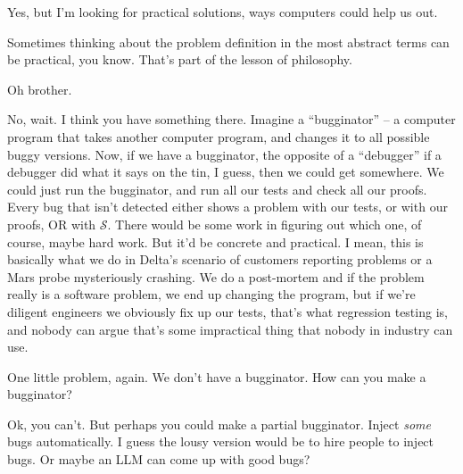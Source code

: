 \documentclass[sigplan]{acmart}
\begin{document}
  Yes, but I'm looking for practical
solutions, ways computers could help us out.

  Sometimes thinking about the problem
definition in the most abstract terms can be practical, you know.
That's part of the lesson of philosophy.

  Oh brother.

  No, wait.  I think you have something
there.  Imagine a ``bugginator'' -- a computer program that takes
another computer program, and changes it to all possible buggy
versions.  Now, if we have a bugginator, the opposite of a
``debugger'' if a debugger did what it says on the tin, I guess, then
we could get somewhere.  We could just run the bugginator, and run all
our tests and check all our proofs.  Every bug that isn't detected
either shows a problem with our tests, or with our proofs, OR with
$\mathcal{S}$.  There would be some work in figuring out which one, of
course, maybe hard work.  But it'd be concrete and practical.  I mean,
this is basically what we do in Delta's scenario of customers
reporting problems or a Mars probe mysteriously crashing.  We do a
post-mortem and if the problem really is a software problem, we end up
changing the program, but if we're diligent engineers we obviously fix
up our tests, that's what regression testing is, and nobody can argue
that's some impractical thing that nobody in industry can use.


  One little problem, again.   We don't
have a bugginator.  How can you make a bugginator?

   Ok, you can't.  But perhaps you could
make a partial bugginator.  Inject \emph{some} bugs automatically.  I
guess the lousy version would be to hire people to inject bugs.  Or
maybe an LLM can come up with good bugs?

\vspace{0.1in}
\vspace{0.1in}
\end{document}
